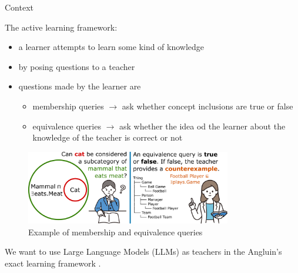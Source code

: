 \documentclass[handout]{beamer}\mode<handout>{\usetheme{AMSBolognaFC}}
\begin{document}
\begin{frame}[c, allowframebreaks]{Context}

    \vfill
    
    The \alert{active learning} framework:
    \vfill
    \begin{itemize}
        \item a \alert{learner} attempts to learn some kind of \alert{knowledge}
        \item by posing questions to a \alert{teacher}

        \vfill

        \item questions made by the learner are
        \begin{itemize}
            \item \alert{membership} queries $\rightarrow$ ask whether \alert{concept inclusions} are true or false
            \item \alert{equivalence} queries $\rightarrow$ ask whether the idea od the learner about the knowledge of the teacher is correct or not
        \end{itemize}
        
        \vfill
        
    \end{itemize}

    \framebreak

    \begin{figure}
        \centering
        \includegraphics[width=0.8\textwidth]{figures/queries-example}
        \caption{Example of membership and equivalence queries}
        \label{}
    \end{figure}

    We want to use \alert{Large Language Models} (LLMs) as teachers in the \alert{Angluin}'s exact learning framework .

\end{frame}
\end{document}
